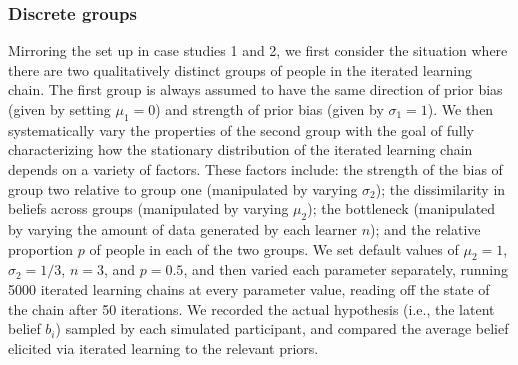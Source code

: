 \documentclass[doc]{apa6}
\begin{document}
\subsubsection{Discrete groups} Mirroring the set up in case studies 1 and 2, we first consider the situation where there are two qualitatively distinct groups of people in the iterated learning chain. The first group is always assumed to have the same direction of prior bias (given by setting $\mu_1=0$) and strength of prior bias (given by $\sigma_1=1$). We then systematically vary the properties of the second group with the goal of fully characterizing how the stationary distribution of the iterated learning chain depends on a variety of factors. These factors include: the strength of the bias of group two relative to group one (manipulated by varying $\sigma_2$); the dissimilarity in beliefs across groups (manipulated by varying $\mu_2$); the bottleneck (manipulated by varying the amount of data generated by each learner $n$); and the relative proportion $p$ of people in each of the two groups. We set default values of $\mu_2=1$, $\sigma_2=1/3$, $n=3$, and $p=0.5$, and then varied each parameter separately, running 5000 iterated learning chains at every parameter value, reading off the state of the chain after 50 iterations. We recorded the actual hypothesis (i.e., the latent belief $b_i$) sampled by each simulated participant, and compared the average belief elicited via iterated learning to the relevant priors. 
\end{document}
